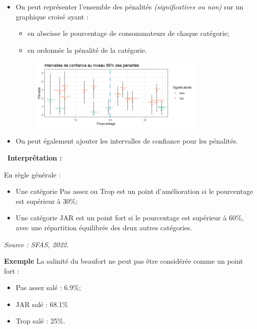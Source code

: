 \documentclass[aspectratio=169,xcolor=dvipsnames]{beamer}
\begin{document}
\begin{frame}
	\begin{itemize}
	\item On peut représenter l'ensemble des pénalités \emph{(significatives ou non)} sur un graphique croisé ayant :
		\begin{itemize}
		\item en abscisse le pourcentage de consommateurs de chaque catégorie;
		\item en ordonnée la pénalité de la catégorie.
		\end{itemize}
	
	\begin{figure}
	\centering
	\includegraphics[width=0.8\textwidth]{conf_pen.png}
	\end{figure}
	\item On peut également ajouter les intervalles de confiance pour les pénalités.
	\end{itemize}
\end{frame}

\begin{frame}
\textcolor{nyubluedarker}{\faCogs \ \textbf{Interprétation :}}

	En règle générale :
		\begin{itemize}
		\item Une catégorie \og Pas assez \fg{} ou \og Trop \fg{} est un point d'amélioration si le pourcentage est supérieur à 30\%;
		\item Une catégorie \og JAR \fg{} est un point fort si le pourcentage est supérieur à 60\%, avec une répartition équilibrée des deux autres catégories.  
		\end{itemize}
	\emph{Source : SFAS, 2022.}
	
	\begin{exampleblock}{\textbf{Exemple}}
	La salinité du beaufort ne peut pas être considérée comme un point fort :
		\begin{itemize}
		\item \og Pas assez \fg{} salé : 6.9\%;
		\item \og JAR \fg{} salé : 68.1\% 
		\item \og Trop \fg{} salé : 25\%. 
		\end{itemize}
	\end{exampleblock}
\end{frame}
\end{document}
